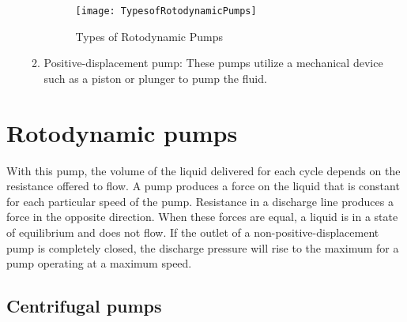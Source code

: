 \begin{itemize}
\begin{enumerate}
\begin{figure}[H]
\begin{center}
\texttt{[image: TypesofRotodynamicPumps]}
\caption{Types of Rotodynamic Pumps}
\end{center}
\end{figure}

\item Positive-displacement pump: These pumps utilize a mechanical device such as a piston or plunger to pump the fluid.
\end{enumerate}

\end{itemize}
\section{Rotodynamic pumps}
With this pump, the volume of the liquid delivered for each cycle depends on the resistance offered to flow. A pump produces a force on the liquid that is constant for each particular speed of the pump. Resistance in a discharge line produces a force in the opposite direction. When these forces are equal, a liquid is in a state of equilibrium and does not flow. If the outlet of a non-positive-displacement pump is completely closed, the discharge pressure will rise to the maximum for a pump operating at a maximum speed.
\subsection{Centrifugal pumps}

